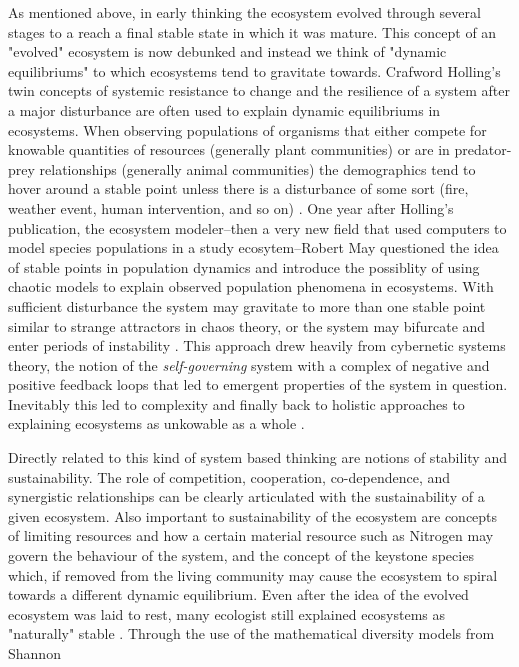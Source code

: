 As mentioned above, in early thinking the ecosystem evolved through several stages to a reach a final stable state in which it was mature. This concept of an "evolved" ecosystem is now debunked and instead we think of "dynamic equilibriums" to which ecosystems tend to gravitate towards. Crafword Holling's twin concepts of systemic resistance to change and the resilience of a system after a major disturbance are often used to explain dynamic equilibriums in ecosystems. When observing populations of organisms that either compete for knowable quantities of resources (generally plant communities) or are in predator-prey relationships (generally animal communities) the demographics tend to hover around a stable point unless there is a disturbance of some sort (fire, weather event, human intervention, and so on) \cite{holling_1973}. One year after Holling's publication, the ecosystem modeler--then a very new field that used computers to model species populations in a study ecosytem--Robert May questioned the idea of stable points in population dynamics and introduce the possiblity of using chaotic models to explain observed population phenomena in ecosystems. With sufficient disturbance the system may gravitate to more than one stable point similar to strange attractors in chaos theory, or the system may bifurcate and enter periods of instability \cite{may_1974}. This approach drew heavily from cybernetic systems theory, the notion of the \textit{self-governing} system with a complex of negative and positive feedback loops that led to emergent properties of the system in question. Inevitably this led to complexity and finally back to holistic approaches to explaining ecosystems as unkowable as a whole \cite{barbour_1996}.

Directly related to this kind of system based thinking are notions of stability and sustainability. The role of competition, cooperation, co-dependence, and synergistic relationships can be clearly articulated with the sustainability of a given ecosystem. Also important to sustainability of the ecosystem are concepts of limiting resources and how a certain material resource such as Nitrogen may govern the behaviour of the system, and the concept of the keystone species which, if removed from the living community may cause the ecosystem to spiral towards a different dynamic equilibrium. Even after the idea of the evolved ecosystem was laid to rest, many ecologist still explained ecosystems as "naturally" stable \cite{odum_1953}. Through the use of the mathematical diversity models from Shannon

